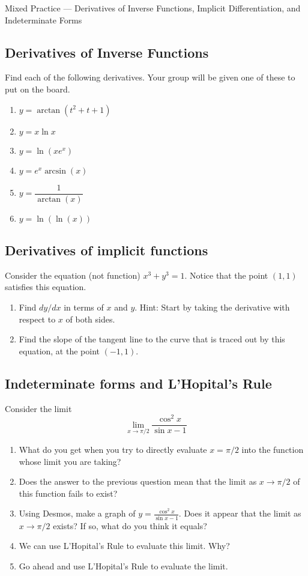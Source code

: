 \documentclass[11pt]{article}
\begin{document}
\begin{center}
    \Large{Mixed Practice --- Derivatives of Inverse Functions, Implicit Differentiation, and Indeterminate Forms}
\end{center}


\subsection*{Derivatives of Inverse Functions}

Find each of the following derivatives. Your group will be given one of these to put on the board. 

\begin{enumerate}
    \item $y = \arctan(t^2 + t+ 1)$
    \item $y = x \ln x$
    \item $y = \ln \left( xe^x \right)$
    \item $y = e^x \arcsin(x)$
    \item $y = \dfrac{1}{\arctan(x)}$
    \item $y = \ln(\ln(x))$
\end{enumerate}


\subsection*{Derivatives of implicit functions}

Consider the equation (not function) $x^3 + y^3 = 1$. Notice that the point $(1,1)$ satisfies this equation. 

\begin{enumerate}
    \item Find $dy/dx$ in terms of $x$ and $y$. Hint: Start by taking the derivative with respect to $x$ of both sides. 
    \item Find the slope of the tangent line to the curve that is traced out by this equation, at the point $(-1,1)$. 
\end{enumerate}

\subsection*{Indeterminate forms and L'Hopital's Rule}

Consider the limit 
$$\lim_{x \to \pi/2} \frac{\cos^2 x}{\sin x - 1}$$

\begin{enumerate}
    \item What do you get when you try to directly evaluate $x = \pi/2$ into the function whose limit you are taking? 
    \item Does the answer to the previous question mean that the limit as $x \to \pi/2$ of this function fails to exist? 
    \item Using Desmos, make a graph of $y = \frac{\cos^2 x}{\sin x - 1}$. Does it appear that the limit as $x \to \pi/2$ exists? If so, what do you think it equals? 
    \item We can use L'Hopital's Rule to evaluate this limit. Why? 
    \item Go ahead and use L'Hopital's Rule to evaluate the limit. 
\end{enumerate}
\end{document}
